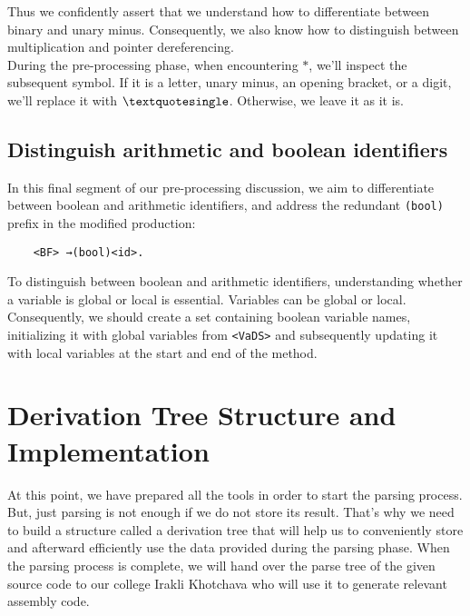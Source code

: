 Thus we confidently assert that we understand how to differentiate between binary and unary minus. Consequently, we also know how to distinguish between multiplication and pointer dereferencing.\\

During the pre-processing phase, when encountering \(\ast\), we'll inspect the subsequent symbol. If it is a letter, unary minus, an opening bracket, or a digit, we'll replace it with \(\textquotesingle\). Otherwise, we leave it as it is.

\vspace{30pt}

\subsection{Distinguish arithmetic and boolean identifiers}

In this final segment of our pre-processing discussion, we aim to differentiate between boolean and arithmetic identifiers, and address the redundant \texttt{(bool)} prefix in the modified production:

\begin{verbatim}
    <BF> →(bool)<id>.
\end{verbatim}

To distinguish between boolean and arithmetic identifiers, understanding whether a variable is global or local is essential. Variables can be global or local. Consequently, we should create a set containing boolean variable names, initializing it with global variables from \texttt{<VaDS>} and subsequently updating it with local variables at the start and end of the method.

\newpage


\section{Derivation Tree Structure and Implementation}\label{sec:Derivation Tree Structure and Implementation}

At this point, we have prepared all the tools in order to start the parsing process. But, just parsing is not enough if we do not store its result. That’s why we need to build a structure called a derivation tree that will help us to conveniently store and afterward efficiently use the data provided during the parsing phase. When the parsing process is complete, we will hand over the parse tree of the given source code to our college Irakli Khotchava who will use it to generate relevant assembly code.

